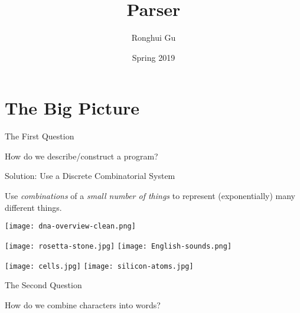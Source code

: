 \documentclass{plt}
\title{Parser}
\author{Ronghui Gu}
\institute{Columbia University}
\date{Spring 2019}
\begin{document}
\frame{\titlepage}

\part{The Big Picture}

\begin{frame}{The First Question}
  \begin{center}
    \large How do we describe/construct a program?
%
  \end{center}
\end{frame}

\begin{frame}{Solution: Use a Discrete Combinatorial System}

Use \emph{combinations} of a \emph{small number of things} to
represent (exponentially) many different things.

\begin{minipage}{0.2\textwidth}
\texttt{[image: dna-overview-clean.png]}
\end{minipage}%
\begin{minipage}{0.8\textwidth}
\hfill
\texttt{[image: rosetta-stone.jpg]} \hfill
\texttt{[image: English-sounds.png]}

\hfill
\texttt{[image: cells.jpg]}
\hfill
\texttt{[image: silicon-atoms.jpg]}
\end{minipage}

\end{frame}

\begin{frame}{The Second Question}
  \begin{center}
    \large How do we combine \alert{characters} into \alert{words}? 

  \end{center}
\end{frame}
\end{document}
